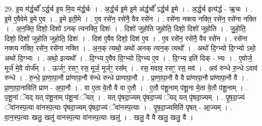 \documentclass[17pt]{extarticle}
\begin{document}
29. इ॒य म॑र्द्ध॒र्चो᳚ ऽर्द्ध॒र्च इ॒य मि॒य म॑र्द्ध॒र्चः । . अ॒र्द्ध॒र्च इ॒मे इ॒मे अ॑र्द्ध॒र्चो᳚ ऽर्द्ध॒र्च इ॒मे । . अ॒र्द्ध॒र्च इत्य॑र्द्ध - ऋ॒चः । . इ॒मे ए॒वैवेमे इ॒मे ए॒व । . इ॒मे इती॒मे । . ए॒व रसे॑न॒ रसे॑नै॒ वैव रसे॑न । . रसे॑ना नक्त्य नक्ति॒ रसे॑न॒ रसे॑ना नक्ति । . अ॒न॒क्ति॒ दिशो॒ दिशो॑ ऽनक् त्यनक्ति॒ दिशः॑ । . दिशो॑ जुहोति जुहोति॒ दिशो॒ दिशो॑ जुहोति । . जु॒हो॒ति॒ दिशो॒ दिशो॑ जुहोति जुहोति॒ दिशः॑ । . दिश॑ ए॒वैव दिशो॒ दिश॑ ए॒व । . ए॒व रसे॑न॒ रसे॑नै॒ वैव रसे॑न । . रसे॑ना नक्त्य नक्ति॒ रसे॑न॒ रसे॑ना नक्ति । . अ॒न॒क् त्यथो॒ अथो॑ अनक् त्यन॒क् त्यथो᳚ । . अथो॑ दि॒ग्भ्यो दि॒ग्भ्यो ऽथो॒ अथो॑ दि॒ग्भ्यः । . अथो॒ इत्यथो᳚ । . दि॒ग्भ्य ए॒वैव दि॒ग्भ्यो दि॒ग्भ्य ए॒व । . दि॒ग्भ्य इति॑ दिक् - भ्यः । . ए॒वोर्ज॒ मूर्ज॑ मे॒वै वोर्ज᳚म् । . ऊर्जꣳ॒॒ रसꣳ॒॒ रस॒ मूर्ज॒ मूर्जꣳ॒॒ रस᳚म् । . रस॒ मवाव॒ रसꣳ॒॒ रस॒ मव॑ । . अव॑ रुन्धे रु॒न्धे ऽवाव॑ रुन्धे । . रु॒न्धे॒ प्रा॒णा॒पा॒नौ प्रा॑णापा॒नौ रु॑न्धे रुन्धे प्राणापा॒नौ । . प्रा॒णा॒पा॒नौ वै वै प्रा॑णापा॒नौ प्रा॑णापा॒नौ वै । . प्रा॒णा॒पा॒नाविति॑ प्राण - अ॒पा॒नौ । . वा ए॒ता वे॒तौ वै वा ए॒तौ । . ए॒तौ प॑शू॒नाम् प॑शू॒ना मे॒ता वे॒तौ प॑शू॒नाम् । . प॒शू॒नां ॅयद् यत् प॑शू॒नाम् प॑शू॒नां ॅयत् । . यत् पृ॑षदा॒ज्यम् पृ॑षदा॒ज्यं ॅयद् यत् पृ॑षदा॒ज्यम् । . पृ॒ष॒दा॒ज्यं ॅवा॑नस्प॒त्या वा॑नस्प॒त्याः पृ॑षदा॒ज्यम् पृ॑षदा॒ज्यं ॅवा॑नस्प॒त्याः । . पृ॒ष॒दा॒ज्यमिति॑ पृषत् - आ॒ज्यम् । . वा॒न॒स्प॒त्याः खलु॒ खलु॑ वानस्प॒त्या वा॑नस्प॒त्याः खलु॑ । . खलु॒ वै वै खलु॒ खलु॒ वै । \newline
\end{document}
